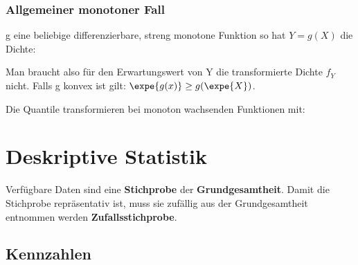 \documentclass[8pt,a4paper]{scrartcl}
\begin{document}
\begin{multicols*}{3}
\subsubsection{Allgemeiner monotoner Fall}

g eine beliebige differenzierbare, streng monotone Funktion so hat $Y=g(X)$ die Dichte:



\finn


Man braucht also für den Erwartungswert von Y die transformierte Dichte $f_Y$ nicht. \hfill Falls g konvex ist gilt: $\expe{g(x)}\geq g(\expe{X})$.

\finn

Die Quantile transformieren bei monoton wachsenden Funktionen mit:



\newpage

\section{Deskriptive Statistik}

Verfügbare Daten sind eine \textbf{Stichprobe} der \textbf{Grundgesamtheit}. Damit die Stichprobe repräsentativ ist, muss sie zufällig aus der Grundgesamtheit entnommen werden \dahe \textbf{Zufallsstichprobe}.

\subsection{Kennzahlen}







\end{multicols*}
\end{document}
